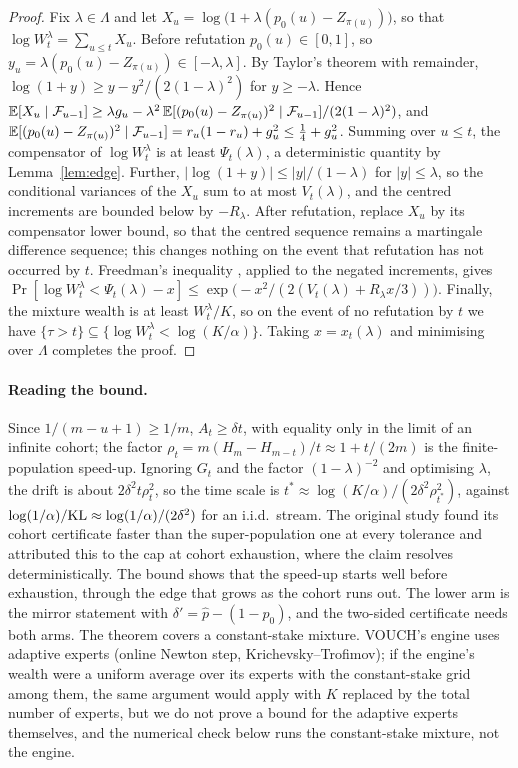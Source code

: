 \begin{proof}
Fix $\lambda\in\Lambda$ and let $X_u=\log\bigl(1+\lambda(p_0(u)-Z_{\pi(u)})\bigr)$,
so that $\log W^\lambda_t=\sum_{u\le t}X_u$. Before refutation $p_0(u)\in[0,1]$, so
$y_u=\lambda(p_0(u)-Z_{\pi(u)})\in[-\lambda,\lambda]$. By Taylor's theorem with
remainder, $\log(1+y)\ge y-y^2/(2(1-\lambda)^2)$ for $y\ge-\lambda$. Hence
$\mathbb{E}[X_u\mid\mathcal{F}_{u-1}]\ge\lambda g_u-\lambda^2\,\mathbb{E}[(p_0(u)-Z_{\pi(u)})^2\mid
\mathcal{F}_{u-1}]/(2(1-\lambda)^2)$, and
$\mathbb{E}[(p_0(u)-Z_{\pi(u)})^2\mid\mathcal{F}_{u-1}]=r_u(1-r_u)+g_u^2\le\frac14+g_u^2$.
Summing over $u\le t$, the compensator of $\log W^\lambda_t$ is at least
$\Psi_t(\lambda)$, a deterministic quantity by Lemma~\ref{lem:edge}. Further,
$|\log(1+y)|\le|y|/(1-\lambda)$ for $|y|\le\lambda$, so the conditional variances of
the $X_u$ sum to at most $V_t(\lambda)$, and the centred increments are bounded below by
$-R_\lambda$. After refutation, replace $X_u$ by its compensator lower bound, so that the
centred sequence remains a martingale difference sequence; this changes nothing on the
event that refutation has not occurred by $t$. Freedman's inequality
\citep{freedman1975tail}, applied to the negated increments, gives
$\Pr[\log W^\lambda_t<\Psi_t(\lambda)-x]\le\exp\bigl(-x^2/(2(V_t(\lambda)+R_\lambda
x/3))\bigr)$. Finally, the mixture wealth is at least $W^\lambda_t/K$, so on the event of
no refutation by $t$ we have $\{\tau>t\}\subseteq\{\log W^\lambda_t<\log(K/\alpha)\}$.
Taking $x=x_t(\lambda)$ and minimising over $\Lambda$ completes the proof.
\end{proof}

\paragraph{Reading the bound.} Since $1/(m-u+1)\ge1/m$, $A_t\ge\delta t$, with equality
only in the limit of an infinite cohort; the factor $\rho_t=m(H_m-H_{m-t})/t\approx
1+t/(2m)$ is the finite-population speed-up. Ignoring $G_t$ and the factor
$(1-\lambda)^{-2}$ and optimising $\lambda$, the drift is about $2\delta^2t\rho_t^2$, so
the time scale is $t^\ast\approx\log(K/\alpha)/(2\delta^2\rho_{t^\ast}^2)$, against
$\log(1/\alpha)/\mathrm{KL}\approx\log(1/\alpha)/(2\delta^2)$ for an i.i.d.\ stream. The original
study found its cohort certificate faster than the super-population one at every
tolerance and attributed this to the cap at cohort exhaustion, where the claim resolves
deterministically. The bound shows that the speed-up starts well before exhaustion,
through the edge that grows as the cohort runs out. The lower arm is the mirror
statement with $\delta'=\hat p-(1-p_0)$, and the two-sided certificate needs both arms.
The theorem covers a constant-stake mixture. VOUCH's engine uses adaptive experts
(online Newton step, Krichevsky--Trofimov); if the engine's wealth were a uniform
average over its experts with the constant-stake grid among them, the same argument
would apply with $K$ replaced by the total number of experts, but we do not prove a
bound for the adaptive experts themselves, and the numerical check below runs the
constant-stake mixture, not the engine.

